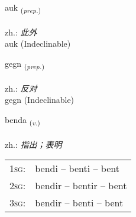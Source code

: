 \documentclass[frontgrid, backgrid]{flacards}\usepackage[]{graphicx}\usepackage[]{xcolor}
\begin{document}
\renewcommand{\blhead}{\vskip5pt {\small\bfseries\footnotesize Forsetning | 介词 }}
\renewcommand{\bcfoot}{\vskip5pt \hspace{2pt}{\small\bfseries\footnotesize 1K}}


{auk \small{\textsubscript{(\textit{prep.})}} \\[1ex]
\textphonetic{[œiːk]} \\
zh.: \emph{此外} \\  [2ex]
auk (Indeclinable)}


\renewcommand{\flhead}{\vskip5pt \fboxsep=0pt {\small\bfseries\footnotesize Forsetning | 介词}}
\renewcommand{\fcfoot}{\vskip5pt \fboxsep=0pt \hspace{2pt}{\small\bfseries\footnotesize 1K}}

\renewcommand{\blhead}{\vskip5pt {\small\bfseries\footnotesize Forsetning | 介词 }}
\renewcommand{\bcfoot}{\vskip5pt \hspace{2pt}{\small\bfseries\footnotesize 1K}}


{gegn \small{\textsubscript{(\textit{prep.})}} \\[1ex]
\textphonetic{[cɛkn̥]} \\
zh.: \emph{反对} \\  [2ex]
gegn (Indeclinable)}

\renewcommand{\flhead}{\vskip5pt \fboxsep=0pt {\small\bfseries\footnotesize Sagnorð | 动词}}
\renewcommand{\fcfoot}{\vskip5pt \fboxsep=0pt \hspace{2pt}{\small\bfseries\footnotesize 1K}}

\renewcommand{\blhead}{\vskip5pt {\small\bfseries\footnotesize Sagnorð | 动词 }}
\renewcommand{\bcfoot}{\vskip5pt \hspace{2pt}{\small\bfseries\footnotesize 1K}}


{benda \small{\textsubscript{(\textit{v.})}} \\[1ex] %
\textphonetic{[pɛnta]} \\
zh.: \emph{指出；表明} \\  [2ex]
\renewcommand*{\arraystretch}{0.8}
\begin{tabular}{p{1cm}l}
\textsc{1sg}: & bendi -- benti -- bent \\ 
\textsc{2sg}: & bendir -- bentir -- bent \\ 
\textsc{3sg}: & bendir -- benti -- bent \\ 
\end{tabular}
}
\end{document}
